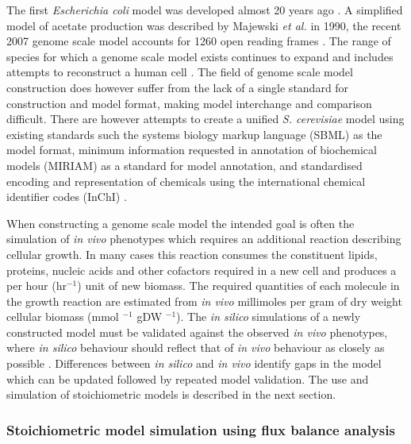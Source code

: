 The first \emph{Escherichia coli} model was developed almost 20 years ago \cite{feist2008}. A simplified model of acetate production was described by Majewski \emph{et al.} in 1990, the recent 2007 genome scale model accounts for 1260 open reading frames \cite{feist2007}. The range of species for which a genome scale model exists continues to expand and includes attempts to reconstruct a human cell \cite{duarte2007}. The field of genome scale model construction does however suffer from the lack of a single standard for construction and model format, making model interchange and comparison difficult. There are however attempts to create a unified \emph{S. cerevisiae} model \cite{herrgard2008} using existing standards such the systems biology markup language (SBML) \cite{sbml} as the model format, minimum information requested in annotation of biochemical models (MIRIAM) \cite{lenovere2005} as a standard for model annotation, and standardised encoding and representation of chemicals using the international chemical identifier codes (InChI) \cite{coles2005}.

When constructing a genome scale model the intended goal is often the simulation of \emph{in vivo} phenotypes which requires an additional reaction describing cellular growth. In many cases this reaction consumes the constituent lipids, proteins, nucleic acids and other cofactors required in a new cell and produces a per hour (hr$^{-1}$) unit of new biomass. The required quantities of each molecule in the growth reaction are estimated from \emph{in vivo} millimoles per gram of dry weight cellular biomass (mmol $^{-1}$ gDW $^{-1}$). The \emph{in silico} simulations of a newly constructed model must be validated against the observed \emph{in vivo} phenotypes, where \emph{in silico} behaviour should reflect that of \emph{in vivo} behaviour as closely as possible \cite{famili2003}. Differences between \emph{in silico} and \emph{in vivo} identify gaps in the model which can be updated followed by repeated model validation. The use and simulation of stoichiometric models is described in the next section.

\subsubsection{Stoichiometric model simulation using flux balance analysis}

